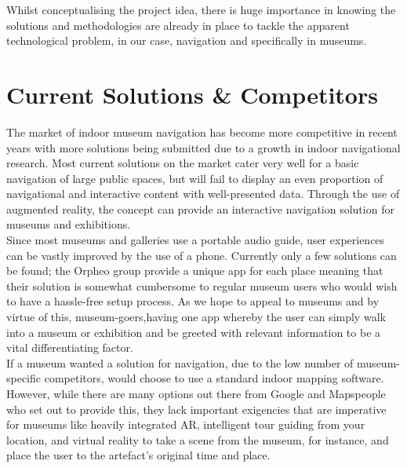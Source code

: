 
Whilst conceptualising the project idea, there is huge importance in knowing the solutions and methodologies are already in place to tackle the apparent technological problem, in our case, navigation and specifically in museums.

\section{Current Solutions \& Competitors}
The market of indoor museum navigation has become more competitive in recent years with more solutions being submitted due to a growth in indoor navigational research. Most current solutions on the market cater very well for a basic navigation of large public spaces, but will fail to display an even proportion of navigational and interactive content with well-presented data. Through the use of augmented reality, the concept can provide an interactive navigation solution for museums and exhibitions.\\
 
Since most museums and galleries use a portable audio guide, user experiences can be vastly improved by the use of a phone. Currently only a few solutions can be found; the Orpheo group \cite{orpheo} provide a unique app for each place meaning that their solution is somewhat cumbersome to regular museum users who would wish to have a hassle-free setup process. As we hope to appeal to museums and by virtue of this, museum-goers,having one app whereby the user can simply walk into a museum or exhibition and be greeted with relevant information to be a vital differentiating factor\cite{microsoft}.\\

If a museum wanted a solution for navigation, due to the low number of museum-specific competitors, would choose to use a standard indoor mapping software. \cite{engadget} However, while there are many options out there from Google and Mapspeople \cite{mapspeople} who set out to provide this, they lack important exigencies that are imperative for museums like heavily integrated AR, intelligent tour guiding from your location, and virtual reality to take a scene from the museum, for instance, and place the user to the artefact's original time and place.